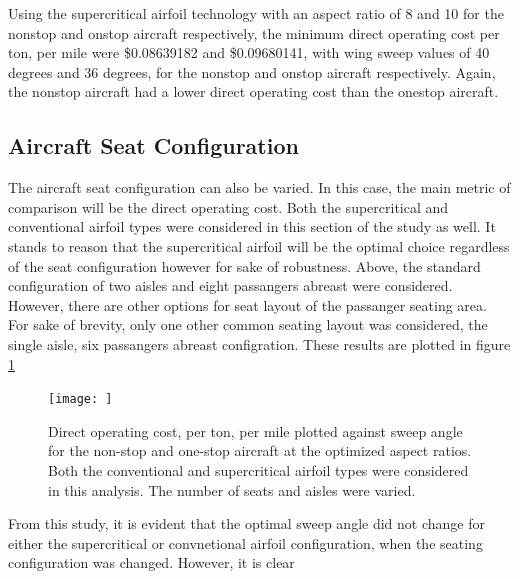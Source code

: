\documentclass{article}
\begin{document}
\begin{flushleft}
            Using the supercritical airfoil technology with an aspect ratio of 8
            and 10 for the nonstop and onstop aircraft respectively, the minimum
            direct operating cost per ton, per mile were \$0.08639182 and
            \$0.09680141, with wing sweep values of 40 degrees and 36 degrees,
            for the nonstop and onstop aircraft respectively. Again, the nonstop
            aircraft had a lower direct operating cost than the onestop
            aircraft.

        \end{flushleft}

    \subsection{Aircraft Seat Configuration}
        \begin{flushleft}
            The aircraft seat configuration can also be varied. In this case,
            the main metric of comparison will be the direct operating cost.
            Both the supercritical and conventional airfoil types were
            considered in this section of the study as well. It stands to reason
            that the supercritical airfoil will be the optimal choice regardless
            of the seat configuration however for sake of robustness. Above, the
            standard configuration of two aisles and eight passangers abreast
            were considered. However, there are other options for seat layout of
            the passanger seating area. For sake of brevity, only one other
            common seating layout was considered, the single aisle, six
            passangers abreast configration. These results are plotted in figure \ref{fig:seats}

            \begin{figure}[ht]
                \centering
                \texttt{[image: ]}
                \caption{Direct operating cost, per ton, per mile plotted against sweep angle for the non-stop and one-stop aircraft at the optimized aspect ratios. Both the conventional and supercritical airfoil types were considered in this analysis. The number of seats and aisles were varied.}
                \label{fig:seats}
            \end{figure}

            From this study, it is evident that the optimal sweep angle did not
            change for either the supercritical or convnetional airfoil
            configuration, when the seating configuration was changed. However,
            it is clear

        \end{flushleft}
\end{document}
